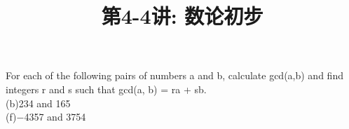 \documentclass[a4paper, justified]{tufte-handout}
\title{第4-4讲: 数论初步}
\date{\zhtoday} %
\begin{document}
\maketitle
\noplagiarism %
\begin{abstract}
\end{abstract}
\beginrequired

\begin{problem}[TJ 2-15(b,f)]
For each of the following pairs of numbers a and b, calculate gcd(a,b) and find integers r and s such that gcd(a, b) = ra + sb.\\
(b)234 and 165\\
(f)−4357 and 3754\\
\end{problem}
\end{document}
